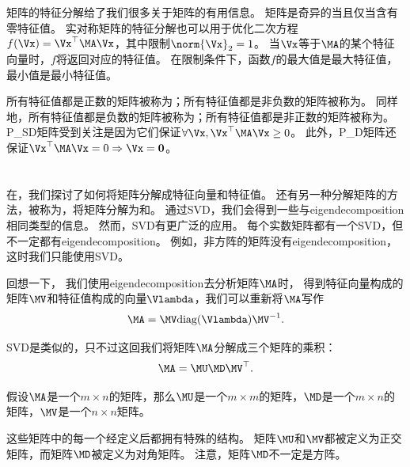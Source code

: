 

矩阵的特征分解给了我们很多关于矩阵的有用信息。
矩阵是奇异的当且仅当含有零特征值。
实对称矩阵的特征分解也可以用于优化二次方程$f(\Vx) = \Vx^\top \MA \Vx$，其中限制$\norm{\Vx}_2 = 1$。
当$\Vx$等于$\MA$的某个特征向量时，$f$将返回对应的特征值。
在限制条件下，函数$f$的最大值是最大特征值，最小值是最小特征值。


所有特征值都是正数的矩阵被称为；所有特征值都是非负数的矩阵被称为。
同样地，所有特征值都是负数的矩阵被称为；所有特征值都是非正数的矩阵被称为。
\gls{P_SD}矩阵受到关注是因为它们保证$\forall \Vx, \Vx^\top \MA \Vx \geq 0$。
此外，\gls{P_D}矩阵还保证$\Vx^\top \MA \Vx =0 \Rightarrow \Vx = \mathbf{0}$。





\section{}
\label{sec:singular_value_decomposition}

在，我们探讨了如何将矩阵分解成特征向量和特征值。
还有另一种分解矩阵的方法，被称为，将矩阵分解为和。
通过\gls{SVD}，我们会得到一些与\gls{eigendecomposition}相同类型的信息。
然而，\gls{SVD}有更广泛的应用。
每个实数矩阵都有一个\gls{SVD}，但不一定都有\gls{eigendecomposition}。
例如，非方阵的矩阵没有\gls{eigendecomposition}，这时我们只能使用\gls{SVD}。


回想一下， 我们使用\gls{eigendecomposition}去分析矩阵$\MA$时， 得到特征向量构成的矩阵$\MV$和特征值构成的向量$\Vlambda$，我们可以重新将$\MA$写作
\begin{equation}
    \MA=\MV\text{diag}(\Vlambda)\MV^{-1}.
\end{equation}

\gls{SVD}是类似的，只不过这回我们将矩阵$\MA$分解成三个矩阵的乘积：
\begin{equation}
    \MA=\MU\MD\MV^\top.
\end{equation}


假设$\MA$是一个$m\times n$的矩阵，那么$\MU$是一个$m\times m$的矩阵，$\MD$是一个$m\times n$的矩阵，$\MV$是一个$n\times n$矩阵。



这些矩阵中的每一个经定义后都拥有特殊的结构。
矩阵$\MU$和$\MV$都被定义为正交矩阵，而矩阵$\MD$被定义为对角矩阵。
注意，矩阵$\MD$不一定是方阵。


